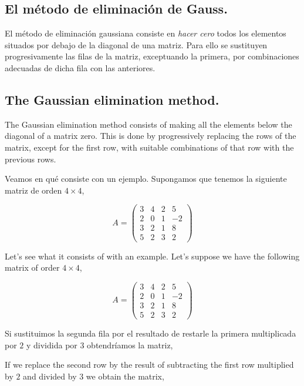 \begin{paracol}{2}
\subsection{El método de eliminación de Gauss.} El método de eliminación gaussiana consiste en \emph{hacer  cero} todos los elementos situados por debajo de la diagonal de una matriz. Para ello se sustituyen progresivamente las filas de la matriz, exceptuando la primera, por combinaciones adecuadas de dicha fila con las anteriores.

\switchcolumn
\subsection{The Gaussian elimination method.}  The Gaussian elimination method consists of making all the elements below the diagonal of a matrix zero. This is done by progressively replacing the rows of the matrix, except for the first row, with suitable combinations of that row with the previous rows.

\switchcolumn
Veamos en qué consiste con un ejemplo. Supongamos que tenemos la siguiente matriz de orden $4 \times 4$, 

\begin{equation*}
A=\begin{pmatrix}
3& 4& 2&5\\
2& 0& 1& -2\\
3& 2& 1& 8\\
5& 2& 3& 2
\end{pmatrix} 
\end{equation*}

\switchcolumn
Let's see what it consists of with an example. Let's suppose we have the following matrix of order $4 \times 4$, 

\begin{equation*}
A=\begin{pmatrix}
3& 4& 2&5\\
2& 0& 1& -2\\
3& 2& 1& 8\\
5& 2& 3& 2
\end{pmatrix} 
\end{equation*}

\switchcolumn

Si sustituimos la segunda fila por el resultado de restarle la primera multiplicada por $2$ y dividida por $3$ obtendríamos la matriz,

\switchcolumn

If we replace the second row by the result of subtracting the first row multiplied by $2$ and divided by $3$ we obtain the matrix,

\end{paracol}

